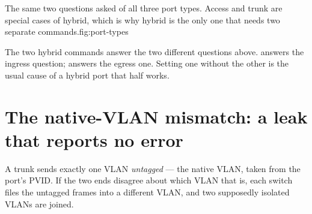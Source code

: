 \begin{utpfig}{The same two questions asked of all three port
types. Access and trunk are special cases of hybrid, which is why hybrid is the
only one that needs two separate commands.}{fig:port-types}
\end{utpfig}

\begin{keyidea}
The two hybrid commands answer the two different questions above.
 answers the ingress question;  answers the egress one. Setting one without
the other is the usual cause of a hybrid port that half works.
\end{keyidea}

\section{The native-VLAN mismatch: a leak that reports no error}
A trunk sends exactly one VLAN \emph{untagged} --- the native VLAN, taken from the port's PVID. If the two ends disagree about which VLAN that is, each switch files the untagged frames into a different VLAN, and two supposedly isolated VLANs are joined.

